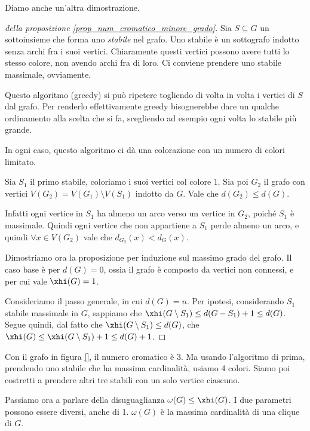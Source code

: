 Diamo anche un'altra dimostrazione.
\begin{proof}[della proposizione \ref{prop_num_cromatico_minore_grado}]
	Sia $S \subseteq G$ un sottoinsieme che forma uno \emph{stabile} nel grafo.
	Uno stabile \`e un sottografo indotto senza archi fra i suoi vertici.
	Chiaramente questi vertici possono avere tutti lo stesso colore, non avendo archi fra di loro.
	Ci conviene prendere uno stabile massimale, ovviamente.

	Questo algoritmo (greedy) si pu\`o ripetere togliendo di volta in volta i vertici di $S$ dal grafo.
	Per renderlo effettivamente greedy bisognerebbe dare un qualche ordinamento alla scelta che si fa, scegliendo ad esempio ogni volta lo stabile pi\`u grande.

	In ogni caso, questo algoritmo ci d\`a una colorazione con un numero di colori limitato.

	Sia $S_1$ il primo stabile, coloriamo i suoi vertici col colore 1.
	Sia poi $G_2$ il grafo con vertici $V(G_2) = V(G_1) \setminus V(S_1)$ indotto da $G$.
	Vale che $d(G_2) \le d(G)$.

	Infatti ogni vertice in $S_1$ ha almeno un arco verso un vertice in $G_2$, poich\'e $S_1$ \`e massimale.
	Quindi ogni vertice che non appartiene a $S_1$ perde almeno un arco, e quindi $\forall x \in V(G_2)$ vale che $d_{G_2}(x) < d_G (x)$.

	Dimostriamo ora la proposizione per induzione sul massimo grado del grafo.
	Il caso base \`e per $d(G) = 0$, ossia il grafo \`e composto da vertici non connessi, e per cui vale $\xhi(G) = 1$.

	Consideriamo il passo generale, in cui $d(G) = n$.
	Per ipotesi, considerando $S_1$ stabile massimale in $G$, sappiamo che $\xhi(G \setminus S_1) \le d(G - S_1) + 1 \le d(G)$.
	Segue quindi, dal fatto che $\xhi(G \setminus S_1) \le d(G)$, che $\xhi(G) \le \xhi(G \setminus S_1) + 1 \le d(G) + 1$.
\end{proof}


Con il grafo in figura \ref{}, il numero cromatico \`e 3.
Ma usando l'algoritmo di prima, prendendo uno stabile che ha massima cardinalit\`a, usiamo 4 colori.
Siamo poi costretti a prendere altri tre stabili con un solo vertice ciascuno.

Passiamo ora a parlare della disuguaglianza $\omega(G) \le \xhi(G)$.
I due parametri possono essere diversi, anche di 1.
$\omega(G)$ \`e la massima cardinalit\`a di una clique di $G$.

